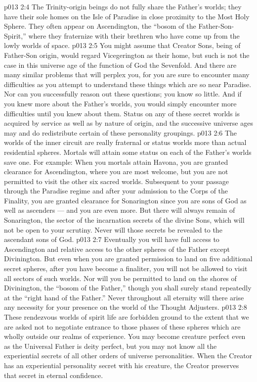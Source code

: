 \vs p013 2:4 \pc The Trinity\hyp{}origin beings do not fully share the Father’s worlds; they have their sole homes on the Isle of Paradise in close proximity to the Most Holy Sphere. They often appear on Ascendington, the “bosom of the Father\hyp{}Son\hyp{}Spirit,” where they fraternize with their brethren who have come up from the lowly worlds of space.
\vs p013 2:5 \pc You might assume that Creator Sons, being of Father\hyp{}Son origin, would regard Vicegerington as their home, but such is not the case in this universe age of the function of God the Sevenfold. And there are many similar problems that will perplex you, for you are sure to encounter many difficulties as you attempt to understand these things which are so near Paradise. Nor can you successfully reason out these questions; you know so little. And if you knew more about the Father’s worlds, you would simply encounter more difficulties until you knew  about them. Status on any of these secret worlds is acquired by service as well as by nature of origin, and the successive universe ages may and do redistribute certain of these personality groupings.
\vs p013 2:6 \pc The worlds of the inner circuit are really fraternal or status worlds more than actual residential spheres. Mortals will attain some status on each of the Father’s worlds save one. For example: When you mortals attain Havona, you are granted clearance for Ascendington, where you are most welcome, but you are not permitted to visit the other six sacred worlds. Subsequent to your passage through the Paradise regime and after your admission to the Corps of the Finality, you are granted clearance for Sonarington since you are sons of God as well as ascenders --- and you are even more. But there will always remain  of Sonarington, the sector of the incarnation secrets of the divine Sons, which will not be open to your scrutiny. Never will those secrets be revealed to the ascendant sons of God.
\vs p013 2:7 Eventually you will have full access to Ascendington and relative access to the other spheres of the Father except Divinington. But even when you are granted permission to land on five additional secret spheres, after you have become a finaliter, you will not be allowed to visit all sectors of such worlds. Nor will you be permitted to land on the shores of Divinington, the “bosom of the Father,” though you shall surely stand repeatedly at the “right hand of the Father.” Never throughout all eternity will there arise any necessity for your presence on the world of the Thought Adjusters.
\vs p013 2:8 These rendezvous worlds of spirit life are forbidden ground to the extent that we are asked not to negotiate entrance to those phases of these spheres which are wholly outside our realms of experience. You may become creature perfect even as the Universal Father is deity perfect, but you may not know all the experiential secrets of all other orders of universe personalities. When the Creator has an experiential personality secret with his creature, the Creator preserves that secret in eternal confidence.

